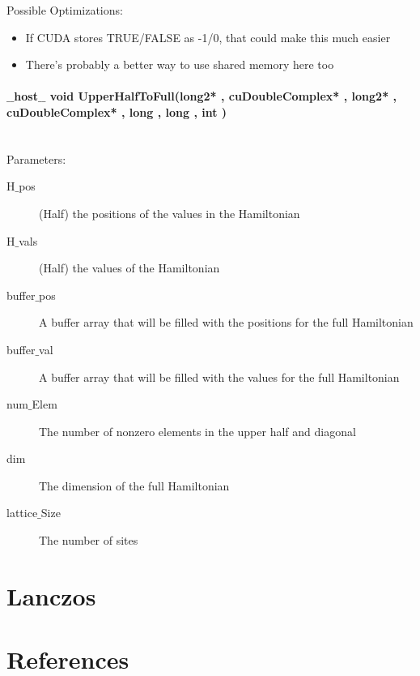 \documentclass{article}
\begin{document}
Possible Optimizations:
\begin{itemize}
\item{If CUDA stores TRUE/FALSE as -1/0, that could make this much easier}
\item{There's probably a better way to use shared memory here too}
\end{itemize}

\paragraph{$\_\_$host$\_\_$ void UpperHalfToFull(long2* , cuDoubleComplex* , long2* , cuDoubleComplex* , long , long , int )}  
\\
Parameters:
\begin{description}
\item[H$\_$pos] (Half) the positions of the values in the Hamiltonian
\item[H$\_$vals] (Half) the values of the Hamiltonian
\item[buffer$\_$pos] A buffer array that will be filled with the positions for the full Hamiltonian
\item[buffer$\_$val] A buffer array that will be filled with the values for the full Hamiltonian
\item[num$\_$Elem] The number of nonzero elements in the upper half and diagonal
\item[dim] The dimension of the full Hamiltonian
\item[lattice$\_$Size] The number of sites
\end{description}

\section{Lanczos}

\section{References}
\end{document}
